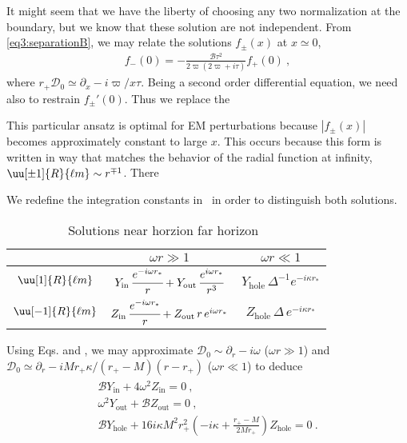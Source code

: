 It might seem that we have the liberty of choosing any two normalization at the boundary, but we know that these solution are not independent.
From \eqref{eq3:separationB}, we may relate the solutions $f_{\pm}(x)$ at $x\simeq0$,
\begin{align}
	f_{-}(0) = -\frac{\mathscr{B} \tau^2 }{2 \varpi ( 2 \varpi + i \tau) } f_{+}(0) ~,
\end{align}
where $r_{+} \mathscr{D}_0 \simeq \partial_x - i \varpi / x \tau$.
Being a second order differential equation, we need also to restrain $f_{\pm}'(0)$. Thus we replace the

This particular ansatz is optimal for EM perturbations because $|f_\pm(x)|$ becomes approximately constant to large $x$.
This occurs because this form is written in way that matches the behavior of the radial function at infinity, $\uu[\pm 1]{R}{\ell m}\sim r^{\mp 1}$.
There


We redefine the integration constants in~ in order to distinguish both solutions.
\begin{table}[h]
	\centering
	\tabulinesep=1.5mm
    \begin{tabu}{@{\hskip 0.25cm}c@{\hskip 0.75cm}c@{\hskip 0.75cm}c@{\hskip 0.25cm}}
        \hline
         & $\omega r \gg 1$ & $\omega r \ll 1$ \\
		\hline\hline
        $\uu[1]{R}{\ell m}$ & $Y_\mathrm{in}\,\cfrac{e^{-i \omega r_*}}{r} + Y_\mathrm{out}\, \cfrac{e^{i \omega r_*}}{r^3}$ & $Y_\mathrm{hole} \,\Delta^{-1} e^{-i \kappa r_{*}}$  \\
		\hline
        $\uu[-1]{R}{\ell m}$ & $Z_\mathrm{in}\,\cfrac{e^{-i \omega r_*}}{r} + Z_\mathrm{out}\, r \,e^{i \omega r_*}$ & $Z_\mathrm{hole} \,\Delta \,e^{-i \kappa r_{*}}$ \\
        \hline
    \end{tabu}
    \caption{Solutions near horzion far horizon~\cite{Teukolsky1974}}
    \label{tb4:solutionsTeukolskyEq}
\end{table}
Using Eqs.  and , we may approximate $\mathscr{D}_0 \sim \partial_r - i \omega$ ($\omega r \gg 1$) and $\mathscr{D}_0 \simeq \partial_r - i M r_{+} \kappa/(r_{+}-M)(r-r_{+}) $ ($\omega r \ll 1$) to deduce 
\begin{align}
	\begin{split}
		\mathscr{B} Y_\mathrm{in} + 4 \omega^2 Z_\mathrm{in} = 0 ~,  \\
		\omega^2 Y_\mathrm{out} + \mathscr{B} Z_\mathrm{out} = 0 ~,  \\
		\mathscr{B} Y_\mathrm{hole} + 16 i \kappa M^2 r_+^2 \left( - i \kappa + \frac{r_{+} - M}{2 M r_{+}} \right) Z_\mathrm{hole} = 0 ~.
	\end{split}
\end{align}